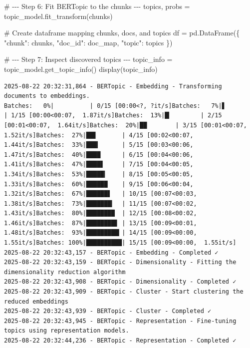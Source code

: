 \documentclass[
  letterpaper,
  DIV=11,
  numbers=noendperiod]{scrartcl}
\newenvironment{Shaded}{\begin{snugshade}}{\end{snugshade}}
\newcommand{\CommentTok}[1]{\textcolor[rgb]{0.37,0.37,0.37}{#1}}
\newcommand{\NormalTok}[1]{\textcolor[rgb]{0.00,0.23,0.31}{#1}}
\newcommand{\OperatorTok}[1]{\textcolor[rgb]{0.37,0.37,0.37}{#1}}
\newcommand{\StringTok}[1]{\textcolor[rgb]{0.13,0.47,0.30}{#1}}
\begin{document}
\begin{Shaded}
\begin{Highlighting}[]
\CommentTok{\# {-}{-}{-} Step 6: Fit BERTopic to the chunks {-}{-}{-}}
\NormalTok{topics, probs }\OperatorTok{=}\NormalTok{ topic\_model.fit\_transform(chunks)}

\CommentTok{\# Create dataframe mapping chunks, docs, and topics}
\NormalTok{df }\OperatorTok{=}\NormalTok{ pd.DataFrame(\{}
    \StringTok{"chunk"}\NormalTok{: chunks,}
    \StringTok{"doc\_id"}\NormalTok{: doc\_map,}
    \StringTok{"topic"}\NormalTok{: topics}
\NormalTok{\})}

\CommentTok{\# {-}{-}{-} Step 7: Inspect discovered topics {-}{-}{-}}
\NormalTok{topic\_info }\OperatorTok{=}\NormalTok{ topic\_model.get\_topic\_info()}
\NormalTok{display(topic\_info)}
\end{Highlighting}
\end{Shaded}

\begin{verbatim}
2025-08-22 20:32:31,864 - BERTopic - Embedding - Transforming documents to embeddings.
Batches:   0%|          | 0/15 [00:00<?, ?it/s]Batches:   7%|▋         | 1/15 [00:00<00:07,  1.87it/s]Batches:  13%|█▎        | 2/15 [00:01<00:07,  1.64it/s]Batches:  20%|██        | 3/15 [00:01<00:07,  1.52it/s]Batches:  27%|██▋       | 4/15 [00:02<00:07,  1.44it/s]Batches:  33%|███▎      | 5/15 [00:03<00:06,  1.47it/s]Batches:  40%|████      | 6/15 [00:04<00:06,  1.41it/s]Batches:  47%|████▋     | 7/15 [00:04<00:05,  1.34it/s]Batches:  53%|█████▎    | 8/15 [00:05<00:05,  1.33it/s]Batches:  60%|██████    | 9/15 [00:06<00:04,  1.32it/s]Batches:  67%|██████▋   | 10/15 [00:07<00:03,  1.38it/s]Batches:  73%|███████▎  | 11/15 [00:07<00:02,  1.43it/s]Batches:  80%|████████  | 12/15 [00:08<00:02,  1.46it/s]Batches:  87%|████████▋ | 13/15 [00:09<00:01,  1.48it/s]Batches:  93%|█████████▎| 14/15 [00:09<00:00,  1.55it/s]Batches: 100%|██████████| 15/15 [00:09<00:00,  1.55it/s]
2025-08-22 20:32:43,157 - BERTopic - Embedding - Completed ✓
2025-08-22 20:32:43,159 - BERTopic - Dimensionality - Fitting the dimensionality reduction algorithm
2025-08-22 20:32:43,908 - BERTopic - Dimensionality - Completed ✓
2025-08-22 20:32:43,909 - BERTopic - Cluster - Start clustering the reduced embeddings
2025-08-22 20:32:43,939 - BERTopic - Cluster - Completed ✓
2025-08-22 20:32:43,945 - BERTopic - Representation - Fine-tuning topics using representation models.
2025-08-22 20:32:44,236 - BERTopic - Representation - Completed ✓
\end{verbatim}
\end{document}
